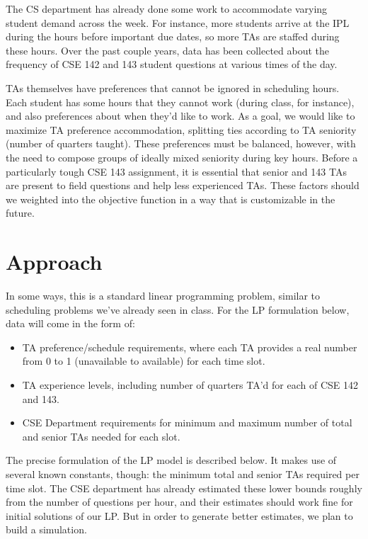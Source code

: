 \documentclass{article}
\begin{document}
\begin{multicols}{2}
The CS department has already done some work to accommodate varying student demand across the week. For instance, more students arrive at the IPL during the hours before important due dates, so more TAs are staffed during these hours. Over the past couple years, data has been collected about the frequency of CSE 142 and 143 student questions at various times of the day.

TAs themselves have preferences that cannot be ignored in scheduling hours. Each student has some hours that they cannot work (during class, for instance), and also preferences about when they'd like to work. As a goal, we would like to maximize TA preference accommodation, splitting ties according to TA seniority (number of quarters taught). These preferences must be balanced, however, with the need to compose groups of ideally mixed seniority during key hours. Before a particularly tough CSE 143 assignment, it is essential that senior and 143 TAs are present to field questions and help less experienced TAs. These factors should we weighted into the objective function in a way that is customizable in the future.

\section*{Approach}
In some ways, this is a standard linear programming problem, similar to scheduling problems we've already seen in class. For the LP formulation below, data will come in the form of:
\begin{itemize}
    \item TA preference/schedule requirements, where each TA provides a real number from 0 to 1 (unavailable to available) for each time slot.
    \item TA experience levels, including number of quarters TA'd for each of CSE 142 and 143.
    \item CSE Department requirements for minimum and maximum number of total and senior TAs needed for each slot.
\end{itemize}

The precise formulation of the LP model is described below. It makes use of several known constants, though: the minimum total and senior TAs required per time slot. The CSE department has already estimated these lower bounds roughly from the number of questions per hour, and their estimates should work fine for initial solutions of our LP. But in order to generate better estimates, we plan to build a simulation.


\end{multicols}
\end{document}
